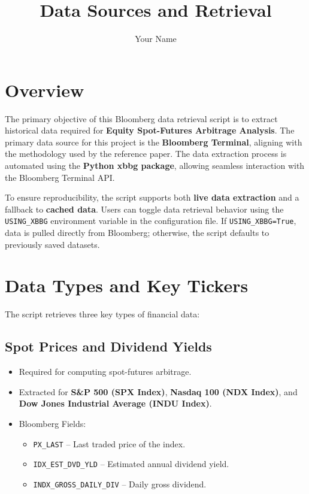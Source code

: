 \documentclass{article}
\title{Data Sources and Retrieval}
\author{Your Name}
\begin{document}
\maketitle

\section{Overview}
The primary objective of this Bloomberg data retrieval script is to extract historical data required for \textbf{Equity Spot-Futures Arbitrage Analysis}. The primary data source for this project is the \textbf{Bloomberg Terminal}, aligning with the methodology used by the reference paper. The data extraction process is automated using the \textbf{Python xbbg package}, allowing seamless interaction with the Bloomberg Terminal API.

To ensure reproducibility, the script supports both \textbf{live data extraction} and a fallback to \textbf{cached data}. Users can toggle data retrieval behavior using the \texttt{USING\_XBBG} environment variable in the configuration file. If \texttt{USING\_XBBG=True}, data is pulled directly from Bloomberg; otherwise, the script defaults to previously saved datasets.

\section{Data Types and Key Tickers}
The script retrieves three key types of financial data:

\subsection{Spot Prices and Dividend Yields}
\begin{itemize}
  \item Required for computing spot-futures arbitrage.
  \item Extracted for \textbf{S\&P 500 (SPX Index)}, \textbf{Nasdaq 100 (NDX Index)}, and \textbf{Dow Jones Industrial Average (INDU Index)}.
  \item Bloomberg Fields:
  \begin{itemize}
    \item \texttt{PX\_LAST} -- Last traded price of the index.
    \item \texttt{IDX\_EST\_DVD\_YLD} -- Estimated annual dividend yield.
    \item \texttt{INDX\_GROSS\_DAILY\_DIV} -- Daily gross dividend.
  \end{itemize}
\end{itemize}
\end{document}

